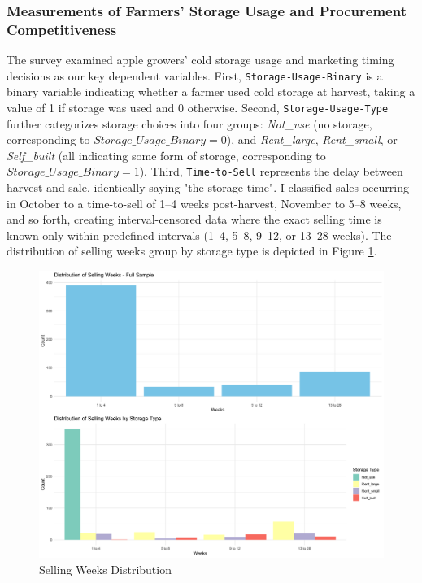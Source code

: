 \documentclass[12pt]{article}
\begin{document}
\subsubsection{Measurements of Farmers' Storage Usage and Procurement Competitiveness}
\noindent The survey examined apple growers' cold storage usage and marketing timing decisions as our key dependent variables. First, \texttt{Storage-Usage-Binary} is a binary variable indicating whether a farmer used cold storage at harvest, taking a value of 1 if storage was used and 0 otherwise. Second, \texttt{Storage-Usage-Type} further categorizes storage choices into four groups: \textit{Not\_use} (no storage, corresponding to $Storage\_Usage\_Binary = 0$), and \textit{Rent\_large}, \textit{Rent\_small}, or \textit{Self\_built} (all indicating some form of storage, corresponding to $Storage\_Usage\_Binary = 1$). Third, \texttt{Time-to-Sell} represents the delay between harvest and sale, identically saying "the storage time". I classified sales occurring in October to a time-to-sell of 1--4 weeks post-harvest, November to 5--8 weeks, and so forth, creating interval-censored data where the exact selling time is known only within predefined intervals (1--4, 5--8, 9--12, or 13--28 weeks). The distribution of selling weeks group by storage type is depicted in Figure \ref{Figure: selling weeks distribution}.

\begin{figure}[H]
\centering
\includegraphics[width=1\textwidth]{figures/selling_weeks_distribution.png}
\caption{Selling Weeks Distribution}
\label{Figure: selling weeks distribution}
\end{figure}
\end{document}
